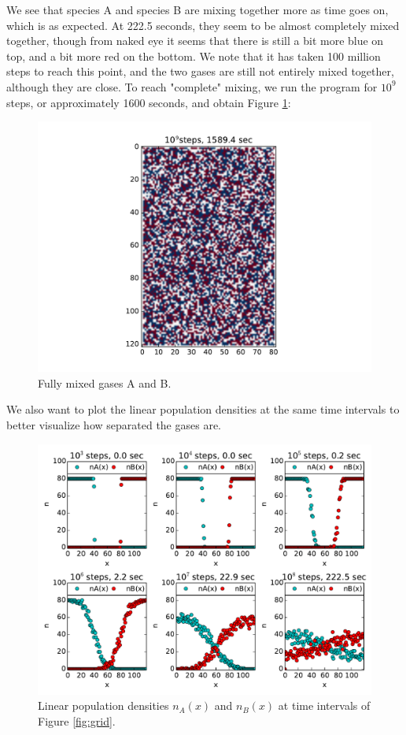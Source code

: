 \documentclass{article}
\begin{document}
\noindent We see that species A and species B are mixing together more as time goes on, which is as expected. At 222.5 seconds, they seem to be almost completely mixed together, though from naked eye it seems that there is still a bit more blue on top, and a bit more red on the bottom. We note that it has taken 100 million steps to reach this point, and the two gases are still not entirely mixed together, although they are close. To reach "complete" mixing, we run the program for $10^{9}$ steps, or approximately 1600 seconds, and obtain Figure \ref{fig:maxdens}:\par
\begin{figure}[H]
\centering
\includegraphics[width=12cm]{figures/GP1_3_maxlimit.pdf}
\caption{Fully mixed gases A and B.}
\label{fig:maxdens}
\end{figure}
We also want to plot the linear population densities at the same time intervals to better visualize how separated the gases are.\par
\begin{figure}[H]
\centering
\includegraphics[width=12cm]{figures/GP1_3b_2.pdf}
\caption{Linear population densities $n_{A}(x)$ and $n_{B}(x)$ at time intervals of Figure \ref{fig:grid}.}
\label{fig:dens}
\end{figure}
\end{document}
